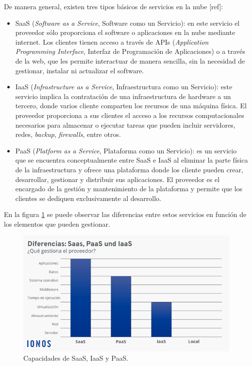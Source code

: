 De manera general, existen tres tipos básicos de servicios en la nube [ref]:

\begin{itemize}
	\item SaaS (\textit{Software as a Service}, Software como un Servicio): en este servicio el proveedor sólo proporciona el software o aplicaciones en la nube mediante internet. Los clientes tienen acceso a través de APIs (\textit{Application Programming Interface}, Interfaz de Programación de Aplicaciones) o a través de la web, que les permite interactuar de manera sencilla, sin la necesidad de gestionar, instalar ni actualizar el software.
	\item IaaS (\textit{Infrastructure as a Service}, Infraestructura como un Servicio): este servicio implica la contratación de una infraestructura de hardware a un tercero, donde varios cliente comparten los recursos de una máquina física. El proveedor proporciona a sus clientes el acceso a los recursos computacionales necesarios para almacenar o ejecutar tareas que pueden incluir servidores, redes, \textit{backup}, \textit{firewalls}, entre otros.
	\item PaaS (\textit{Platform as a Service}, Plataforma como un Servicio): es un servicio que se encuentra conceptualmente entre SaaS e IaaS al eliminar la parte física de la infraestructura y ofrece una plataforma donde los cliente pueden crear, desarrollar, gestionar y distribuir sus aplicaciones. El proveedor es el encargado de la gestión y mantenimiento de la plataforma y permite que los clientes se dediquen exclusivamente al desarrollo.
\end{itemize}

En la figura \ref{fig:cloud_services} se puede observar las diferencias entre estos servicios en función de los elementos que pueden gestionar.

\begin{figure}[h]
	\centering
	\includegraphics[scale=0.55]{./Figures/cloud_services.png}
	\caption{Capacidades de SaaS, IaaS y PaaS\protect\footnotemark.}
	\label{fig:cloud_services}
\end{figure}


